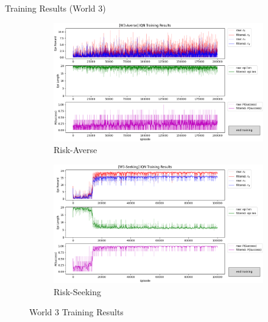 \documentclass[aspectratio=1610, xcolor=dvipsnames]{packages/beamer}
\begin{document}
\begin{frame}{Training Results (World 3)}
     \begin{figure}
     \centering
         \begin{subfigure}[b]{\Wfig\textwidth} \centering
             \includegraphics[width=\textwidth]{../results/IDQN_W3/Fig_W3_JointQ_Averse}
             \caption{Risk-Averse} \label{fig:W3averse}
         \end{subfigure}
         \hfill
         \begin{subfigure}[b]{\Wfig\textwidth} \centering
             \includegraphics[width=\textwidth]{../results/IDQN_W3/Fig_W3_JointQ_Seeking}
             \caption{Risk-Seeking} \label{fig:W3seeking}
         \end{subfigure}
    \caption{World 3 Training Results}
    \label{fig:W3}
    \end{figure}
\end{frame}
\end{document}
